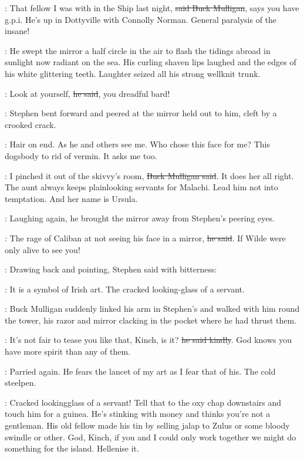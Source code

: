 \Mulligan:
That fellow I was with in the Ship last night,
\sout{said Buck Mulligan},
says you have g.p.i.
He's up in Dottyville with Connolly Norman.
General paralysis of the insane!

:
He swept the mirror a half circle in the air
to flash the tidings abroad
in sunlight now radiant on the sea.
His curling shaven lips laughed
and the edges of his white glittering teeth.
Laughter seized all his strong wellknit trunk.

\Mulligan:
Look at yourself,
\sout{he said},
you dreadful bard!

:
Stephen bent forward
and peered at the mirror held out to him,
cleft by a crooked crack.

\StephenInt:
Hair on end.
As he and others see me.
Who chose this face for me?
This dogsbody to rid of vermin.
It asks me too.

\Mulligan:
I pinched it out of the skivvy's room,
\sout{Buck Mulligan said}.
It does her all right.
The aunt always keeps plainlooking servants for Malachi.
Lead him not into temptation.
And her name is Ursula.

:
Laughing again,
he brought the mirror away from Stephen's peering eyes.

\Mulligan:
The rage of Caliban
at not seeing his face in a mirror,
\sout{he said}.
If Wilde were only alive to see you!

:
Drawing back and pointing,
Stephen said with bitterness:

\Stephen:
It is a symbol of Irish art.
The cracked looking-glass of a servant.

:
Buck Mulligan suddenly linked his arm in Stephen's
and walked with him round the tower,
his razor and mirror clacking
in the pocket where he had thrust them.

\Mulligan:
It's not fair to tease you like that,
Kinch, is it?
\sout{he said kindly}.
God knows you have more spirit than any of them.

\StephenInt:
Parried again.
He fears the lancet of my art as I fear that of his.
The cold steelpen.

\Mulligan:
Cracked lookingglass of a servant!
Tell that to the oxy chap downstairs and touch him for a guinea.
He's stinking with money and thinks you're not a gentleman.
His old fellow made his tin
by selling jalap to Zulus or some bloody swindle or other.
God, Kinch, if you and I could only work together
we might do something for the island.
Hellenise it.

